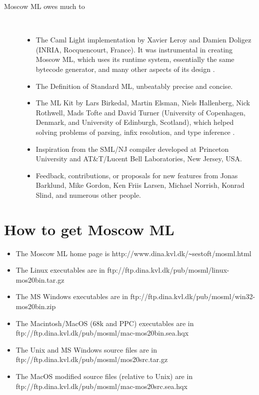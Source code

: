 \documentclass[fleqn]{article}
\begin{document}
\begin{description}
\item[Moscow ML owes much to]\mbox{ }
\begin{itemize}
\item The Caml Light implementation by Xavier Leroy and Damien Doligez
  (INRIA, Rocquencourt, France).  It was instrumental in creating
  Moscow ML, which uses its runtime system, essentially the same
  bytecode generator, and many other aspects of its design
  \cite{Leroy:1990:TheZinc,Leroy:1993:TheCaml}.
\item The Definition of Standard ML, unbeatably precise and concise.
\item The ML Kit by Lars Birkedal, Martin Elsman, Niels Hallenberg,
  Nick Rothwell, Mads Tofte and David Turner (University of
  Copenhagen, Denmark, and University of Edinburgh, Scotland), which
  helped solving problems of parsing, infix resolution, and type
  inference \cite{Birkedal:1993:TheML}.
\item Inspiration from the SML/NJ compiler developed at Princeton
  University and AT\&T/Lucent Bell Laboratories, New Jersey,
  USA.
\item Feedback, contributions, or proposals for new features from
  Jonas Barklund, Mike Gordon, Ken Friis Larsen, Michael Norrish,
  Konrad Slind, and numerous other people.
\end{itemize}
\end{description}


\section{How to get Moscow ML}
\label{sec-how-to-get}

\begin{itemize}
\item The Moscow ML home page is
        http://www.dina.kvl.dk/\verb#~#sestoft/mosml.html
\item The Linux executables are in
        ftp://ftp.dina.kvl.dk/pub/mosml/linux-mos20bin.tar.gz
\item The MS Windows executables are in 
        ftp://ftp.dina.kvl.dk/pub/mosml/win32-mos20bin.zip
\item The Macintosh/MacOS (68k and PPC) executables are in\\
        ftp://ftp.dina.kvl.dk/pub/mosml/mac-mos20bin.sea.hqx
\item The Unix and MS Windows source files are in 
        ftp://ftp.dina.kvl.dk/pub/mosml/mos20src.tar.gz
\item The MacOS modified source files (relative to Unix) are in\\
        ftp://ftp.dina.kvl.dk/pub/mosml/mac-mos20src.sea.hqx
\end{itemize}
\end{document}
